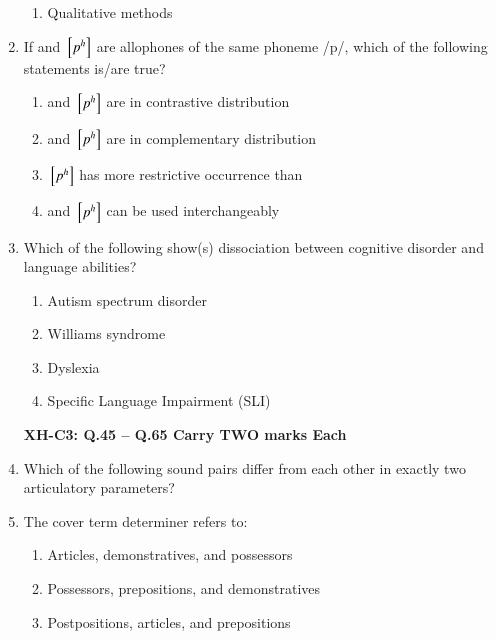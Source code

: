 \documentclass[12pt]{article}
\theoremstyle{remark}
\begin{document}
\begin{enumerate}
\begin{enumerate}
\item Qualitative methods
\end{enumerate}
\hfill{}
\item If  and ${}\left[p^h\right] $ are allophones of the same phoneme /p/, which of the following statements is/are true?
\begin{enumerate} 
	\item {} and ${}\left[p^h\right] $ are in contrastive distribution
	\item {} and ${}\left[p^h\right] $ are in complementary distribution
	\item ${}\left[p^h\right] $ has more restrictive occurrence than 
	\item {} and ${}\left[p^h\right] $ can be used interchangeably
\end{enumerate}
\hfill{}
\item Which of the following show(s) dissociation between cognitive disorder and language abilities?
\begin{enumerate} 
\item Autism spectrum disorder
\item Williams syndrome
\item Dyslexia
\item Specific Language Impairment (SLI)
\end{enumerate}
\hfill{}
\newpage
\textbf{XH-C3: Q.45 – Q.65 Carry TWO marks Each}
\item Which of the following sound pairs differ from each other in exactly two articulatory parameters?
\begin{enumerate}  \end{enumerate}
\hfill{}
\item The cover term determiner refers to:
\begin{enumerate} 
\item Articles, demonstratives, and possessors
\item Possessors, prepositions, and demonstratives
\item Postpositions, articles, and prepositions

\end{enumerate}
\end{enumerate}
\end{document}

